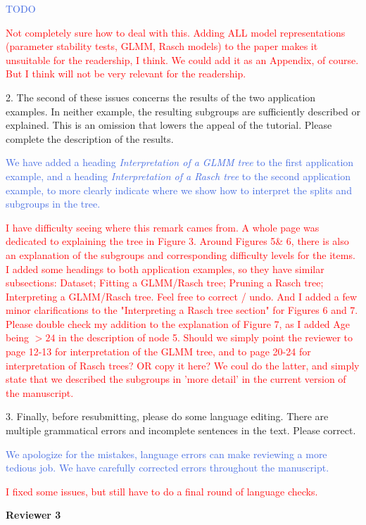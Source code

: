 \documentclass{letter}
\newcommand{\auth}[1]{\textcolor{RoyalBlue}{#1}}
\newcommand{\MF}[1]{\textcolor{red}{#1}}
\begin{document}
\auth{TODO}

\MF{Not completely sure how to deal with this. Adding ALL model representations (parameter stability tests, GLMM, Rasch models) to the paper makes it unsuitable for the readership, I think. We could add it as an Appendix, of course. But I think will not be very relevant for the readership.}

2. The second of these issues concerns the results of the two application examples. In neither example, the resulting subgroups are sufficiently described or explained. This is an omission that lowers the appeal of the tutorial. Please complete the description of the results.

\auth{We have added a heading \textit{Interpretation of a GLMM tree} to the first application example, and a heading \textit{Interpretation of a Rasch tree} to the second application example, to more clearly indicate where we show how to interpret the splits and subgroups in the tree. }

\MF{I have difficulty seeing where this remark cames from. A whole page was dedicated to explaining the tree in Figure 3. Around Figures 5\& 6, there is also an explanation of the subgroups and corresponding difficulty levels for the items. I added some headings to both application examples, so they have similar subsections: Dataset; Fitting a GLMM/Rasch tree; Pruning a Rasch tree; Interpreting a GLMM/Rasch tree. Feel free to correct / undo. And I added a few minor clarifications to the "Interpreting a Rasch tree section" for Figures 6 and 7. Please double check my addition to the explanation of Figure 7, as I added Age being $>24$ in the description of node 5. Should we simply point the reviewer to page 12-13 for interpretation of the GLMM tree, and to page 20-24 for interpretation of Rasch trees? OR copy it here? We coul do the latter, and simply state that we described the subgroups in 'more detail' in the current version of the manuscript.}


3. Finally, before resubmitting, please do some language editing. There are multiple grammatical errors and incomplete sentences in the text. Please correct.

\auth{We apologize for the mistakes, language errors can make reviewing a more tedious job. We have carefully corrected errors throughout the manuscript.}

\MF{I fixed some issues, but still have to do a final round of language checks.}


\textbf{Reviewer 3}
\end{document}
